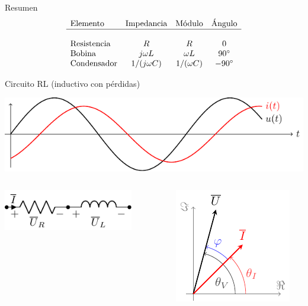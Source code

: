 \documentclass[aspectratio=169, usenames,svgnames,dvipsnames]{beamer}
\begin{document}
\begin{frame}[label={sec:org9f75609}]{Resumen}
\[
  \begin{array}{lccc}
    \text{Elemento} & \text{Impedancia} & \text{Módulo} & \text{Ángulo}\\
    \hline\\
    \text{Resistencia} & R & R & 0\\
    \text{Bobina} & j \omega L & \omega L & \ang{90}\\
     \text{Condensador} & 1/(j \omega C) & 1/(\omega C) & \ang{-90}\\
  \end{array}
\]
\end{frame}
\begin{frame}[label={sec:orgabc33f0}]{Circuito RL (inductivo con pérdidas)}
\begin{center}
\includegraphics[height=0.25\textheight]{../figs/inductivo.pdf}
\end{center}
\begin{columns}
\begin{column}{0.45\columnwidth}
\begin{center}
\includegraphics[width=0.8\textwidth]{../figs/RL.pdf}
\end{center}
\end{column}


\begin{column}{0.55\columnwidth}
\begin{center}
\includegraphics[height=0.5\textheight]{../figs/fasorInductanciaReal_VI.pdf}
\end{center}
\end{column}
\end{columns}
\end{frame}
\end{document}
